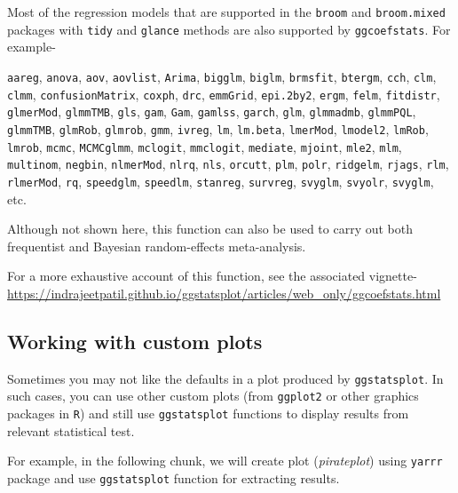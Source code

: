 \documentclass[]{article}
\begin{document}
Most of the regression models that are supported in the \texttt{broom} and
\texttt{broom.mixed} packages with \texttt{tidy} and \texttt{glance} methods are also supported by
\texttt{ggcoefstats}. For example-

\texttt{aareg}, \texttt{anova}, \texttt{aov}, \texttt{aovlist}, \texttt{Arima}, \texttt{bigglm}, \texttt{biglm}, \texttt{brmsfit},
\texttt{btergm}, \texttt{cch}, \texttt{clm}, \texttt{clmm}, \texttt{confusionMatrix}, \texttt{coxph}, \texttt{drc}, \texttt{emmGrid},
\texttt{epi.2by2}, \texttt{ergm}, \texttt{felm}, \texttt{fitdistr}, \texttt{glmerMod}, \texttt{glmmTMB}, \texttt{gls}, \texttt{gam},
\texttt{Gam}, \texttt{gamlss}, \texttt{garch}, \texttt{glm}, \texttt{glmmadmb}, \texttt{glmmPQL}, \texttt{glmmTMB}, \texttt{glmRob},
\texttt{glmrob}, \texttt{gmm}, \texttt{ivreg}, \texttt{lm}, \texttt{lm.beta}, \texttt{lmerMod}, \texttt{lmodel2}, \texttt{lmRob},
\texttt{lmrob}, \texttt{mcmc}, \texttt{MCMCglmm}, \texttt{mclogit}, \texttt{mmclogit}, \texttt{mediate}, \texttt{mjoint}, \texttt{mle2},
\texttt{mlm}, \texttt{multinom}, \texttt{negbin}, \texttt{nlmerMod}, \texttt{nlrq}, \texttt{nls}, \texttt{orcutt}, \texttt{plm}, \texttt{polr},
\texttt{ridgelm}, \texttt{rjags}, \texttt{rlm}, \texttt{rlmerMod}, \texttt{rq}, \texttt{speedglm}, \texttt{speedlm}, \texttt{stanreg},
\texttt{survreg}, \texttt{svyglm}, \texttt{svyolr}, \texttt{svyglm}, etc.

Although not shown here, this function can also be used to carry out both
frequentist and Bayesian random-effects meta-analysis.

For a more exhaustive account of this function, see the associated vignette-
\url{https://indrajeetpatil.github.io/ggstatsplot/articles/web_only/ggcoefstats.html}

\hypertarget{working-with-custom-plots}{%
\subsection{Working with custom plots}\label{working-with-custom-plots}}

Sometimes you may not like the defaults in a plot produced by \texttt{ggstatsplot}. In
such cases, you can use other custom plots (from \texttt{ggplot2} or other graphics
packages in \texttt{R}) and still use \texttt{ggstatsplot} functions to display results from relevant
statistical test.

For example, in the following chunk, we will create plot (\emph{pirateplot}) using
\texttt{yarrr} package and use \texttt{ggstatsplot} function for extracting results.
\end{document}
